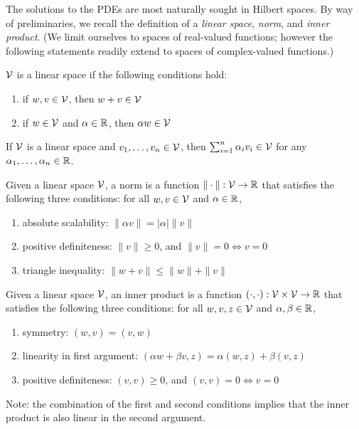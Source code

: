 The solutions to the PDEs are most naturally sought in Hilbert spaces. By way of preliminaries, we recall the definition of a \emph{linear space}, \emph{norm}, and \emph{inner product}. (We limit ourselves to spaces of real-valued functions; however the following statements readily extend to spaces of complex-valued functions.)
\begin{definition}
  $\mathcal{V}$ is a linear space if the following conditions hold:
  \begin{enumerate}
  \item if $w,v \in \mathcal{V}$, then $w + v \in \mathcal{V}$
  \item if $w \in \mathcal{V}$ and $\alpha \in \mathbb{R}$, then $\alpha w \in \mathcal{V}$
  \end{enumerate}
\end{definition}
\begin{remark}
  If $\mathcal{V}$ is a linear space and $v_1,\dots,v_n \in \mathcal{V}$, then $\sum_{i=1}^n \alpha_i v_i \in \mathcal{V}$ for any $\alpha_1, \dots, \alpha_n \in \mathbb{R}$.
\end{remark}
\begin{definition}[norm]
  Given a linear space $\mathcal{V}$, a norm is a function $\| \cdot \| : \mathcal{V} \to \mathbb{R}$ that satisfies the following three conditions: for all $w,v \in \mathcal{V}$ and $\alpha \in \mathbb{R}$, 
  \begin{enumerate}
  \item absolute scalability: $\| \alpha v \| = |\alpha| \| v \|$
  \item positive definiteness: $ \| v \| \geq 0$,  and $\| v \| = 0 \Leftrightarrow v = 0$
  \item triangle inequality: $  \| w + v \| \leq \| w \| + \| v \| $
  \end{enumerate}
\end{definition}
\begin{definition}
  Given a linear space $\mathcal{V}$, an inner product is a function $(\cdot,\cdot): \mathcal{V} \times \mathcal{V} \to \mathbb{R}$ that satisfies the following three conditions: for all $w,v,z \in \mathcal{V}$ and $\alpha,\beta \in \mathbb{R}$,
\begin{enumerate}
\item symmetry: $(w,v) = (v,w)$
\item linearity in first argument: $ (\alpha w + \beta v, z) = \alpha (w,z) + \beta (v,z)$
\item positive definiteness: $ (v,v) \geq 0$, and $(v,v) = 0 \Leftrightarrow v = 0 $
\end{enumerate}
Note: the combination of the first and second conditions implies that the inner product is also linear in the second argument.
\end{definition}
